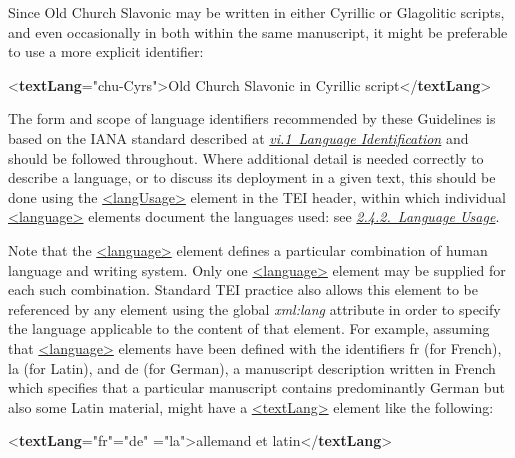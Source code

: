 Since Old Church Slavonic may be written in either Cyrillic or Glagolitic scripts, and even occasionally in both within the same manuscript, it might be preferable to use a more explicit identifier: \par\bgroup{}\exampleFont \begin{shaded}\noindent\mbox{}{<\textbf{textLang}\hspace*{1em}{mainLang}="{chu-Cyrs}">}Old Church Slavonic in Cyrillic script{</\textbf{textLang}>}\end{shaded}\egroup\par \par
The form and scope of language identifiers recommended by these Guidelines is based on the IANA standard described at \textit{\hyperref[CHSH]{vi.1\ Language Identification}} and should be followed throughout. Where additional detail is needed correctly to describe a language, or to discuss its deployment in a given text, this should be done using the \hyperref[TEI.langUsage]{<langUsage>} element in the TEI header, within which individual \hyperref[TEI.language]{<language>} elements document the languages used: see \textit{\hyperref[HD41]{2.4.2.\ Language Usage}}.\par
Note that the \hyperref[TEI.language]{<language>} element defines a particular combination of human language and writing system. Only one \hyperref[TEI.language]{<language>} element may be supplied for each such combination. Standard TEI practice also allows this element to be referenced by any element using the global {\itshape xml:lang} attribute in order to specify the language applicable to the content of that element. For example, assuming that \hyperref[TEI.language]{<language>} elements have been defined with the identifiers \textsf{fr} (for French), \textsf{la} (for Latin), and \textsf{de} (for German), a manuscript description written in French which specifies that a particular manuscript contains predominantly German but also some Latin material, might have a \hyperref[TEI.textLang]{<textLang>} element like the following: \par\bgroup{}\exampleFont \begin{shaded}\noindent\mbox{}{<\textbf{textLang}\hspace*{1em}{xml:lang}="{fr}"\hspace*{1em}{mainLang}="{de}"\mbox{}\newline 
\hspace*{1em}{otherLangs}="{la}">}allemand et\mbox{}\newline 
 latin{</\textbf{textLang}>}\end{shaded}\egroup\par 

